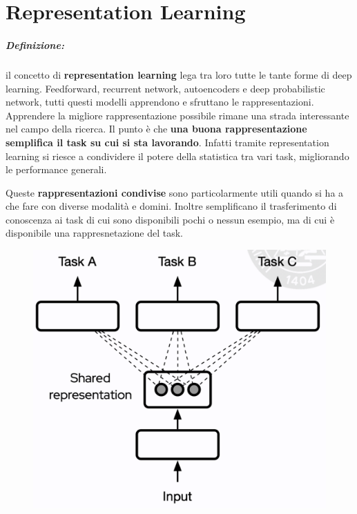 \chapter{Representation Learning}
\paragraph{Definizione:} il concetto di \textbf{representation learning} lega tra loro tutte le tante forme di deep learning.
Feedforward, recurrent network, autoencoders e deep probabilistic network, tutti questi modelli apprendono e sfruttano le rappresentazioni.
Apprendere la migliore rappresentazione possibile rimane una strada interessante nel campo della ricerca.
\newline
\newline
Il punto è che \textbf{una buona rappresentazione semplifica il task su cui si sta lavorando}. Infatti tramite
representation learning si riesce a condividere il potere della statistica tra vari task, migliorando
le performance generali.


Queste \textbf{rappresentazioni condivise} sono particolarmente utili quando si ha a che fare con diverse
modalità e domini. Inoltre semplificano il trasferimento di conoscenza ai task di cui sono disponibili
pochi o nessun esempio, ma di cui è disponibile una rappresnetazione del task.
\begin{figure}[!h]
  \includegraphics[scale=.5]{images/representation_learning/example.png}
  \centering
\end{figure}


